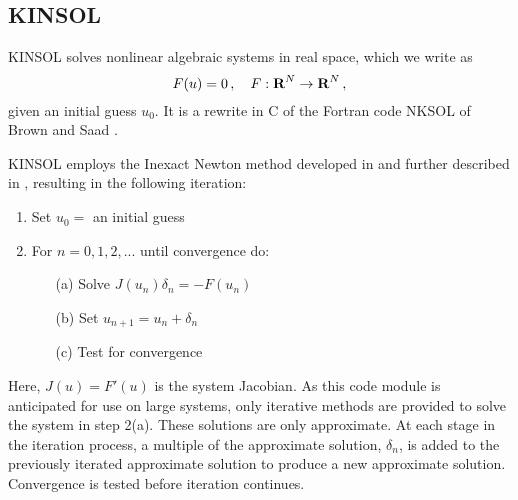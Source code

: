 \subsection{KINSOL}\label{ss:kinsol}

KINSOL solves nonlinear algebraic systems in real space, which we write as
\begin{equation}\label{nonlinear_system}
  F(u) = 0 \, , \quad F:\mbox{\bf R}^N \rightarrow \mbox{\bf R}^N \, , 
\end{equation}
given an initial guess $u_0$.  It is a rewrite in C of the Fortran
code NKSOL of Brown and Saad \cite{BrSa:90}.

KINSOL employs the Inexact Newton method developed in 
\cite{BrSa:90,Bro:87,DES:82} 
and further described in \cite{DeSc:96,Kel:95}, 
resulting in the following iteration:

\vspace{1ex}
\begin{enumerate}
   \item Set $u_0 = $ an initial guess
   \item For $n = 0, 1, 2,...$ until convergence do:
      \begin{itemize}
          \item[(a)] Solve $J(u_n)\delta_n = - F(u_n)$ 
          \item[(b)] Set $u_{n+1} = u_n + \delta_n$
          \item[(c)] Test for convergence
      \end{itemize}
\end{enumerate}
Here, $J(u) = F'(u)$ is the system Jacobian. As this code module is
anticipated for use on large systems, only iterative methods are provided 
to solve the system in step 2(a). These solutions are only approximate. 
At each stage in the iteration process, a multiple of the 
approximate solution, $\delta_n$, is added 
to the previously iterated approximate solution to produce a new 
approximate solution. Convergence is tested before iteration continues. 

